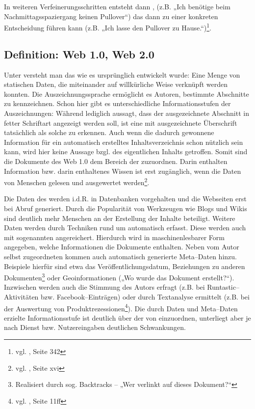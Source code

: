 In weiteren Verfeinerungsschritten entsteht dann , (z.B. „Ich benötige beim Nachmittagsspaziergang keinen Pullover“) das dann zu einer konkreten Entscheidung führen kann (z.B. „Ich lasse den Pullover zu Hause.“)\footnote{vgl. \cite{taylor}, Seite 342}.

\subsection{Definition: Web 1.0, Web 2.0}

Unter  versteht man das  wie es ursprünglich entwickelt wurde: Eine Menge von statischen Daten, die miteinander auf willkürliche Weise verknüpft werden konnten. Die Auszeichnungssprache  ermöglicht es Autoren, bestimmte Abschnitte zu kennzeichnen. Schon hier gibt es unterschiedliche Informationsstufen der Auszeichnungen: Während  lediglich aussagt, dass der ausgezeichnete Abschnitt in fetter Schriftart angezeigt werden soll, ist eine mit  ausgezeichnete Überschrift tatsächlich als solche zu erkennen. Auch wenn die dadurch gewonnene Information für ein automatisch erstelltes Inhaltsverzeichnis schon nützlich sein kann, wird hier keine Aussage bzgl. des eigentlichen Inhalts getroffen. Somit sind die Dokumente des Web 1.0 dem Bereich der  zuzuordnen. Darin enthalten Information bzw. darin enthaltenes Wissen ist erst zugänglich, wenn die Daten von Menschen gelesen und ausgewertet werden\footnote{vgl. \cite{alkhatib}, Seite xvi}.

Die Daten des  werden i.d.R. in Datenbanken vorgehalten und die Webseiten erst bei Abruf generiert. Durch die Popularität von Werkzeugen wie Blogs und Wikis sind deutlich mehr Menschen an der Erstellung der Inhalte beteiligt. Weitere Daten werden durch Techniken rund um  automatisch erfasst. Diese werden auch mit sogenannten  angereichert. Hierdurch wird in maschinenlesbarer Form angegeben, welche Informationen die Dokumente enthalten. Neben vom Autor selbst zugeordneten  kommen auch automatisch generierte Meta--Daten hinzu. Beispiele hierfür sind etwa das Veröffentlichungsdatum, Beziehungen zu anderen Dokumenten\footnote{Realisiert durch sog. Backtracks -- „Wer verlinkt auf dieses Dokument?“} oder Geoinformationen („Wo wurde das Dokument erstellt?“). Inzwischen werden auch die Stimmung des Autors erfragt (z.B. bei Runtastic–Aktivitäten bzw. Facebook--Einträgen) oder durch Textanalyse ermittelt (z.B. bei der Auswertung von Produktrezessionen\footnote{vgl. \cite{sprejz}, Seite 11ff}). Die durch Daten und Meta--Daten erzielte Informationsstufe ist deutlich über der von  einzuordnen, unterliegt aber je nach Dienst bzw. Nutzereingaben deutlichen Schwankungen.

